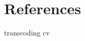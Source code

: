 
\cleardoublepage
\chapter*{References}

\begingroup
{}
\renewcommand{\addcontentsline}[3]{}
\renewcommand{\chapter}[2]{}

\endgroup


\vspace{1 cm}
	\cite{github2014}

\vspace{1 cm}
\gls{transcoding} \gls{cv}


\begin{comment}

http://www.aforgenet.com/

http://itseez.com/

\end{comment}
